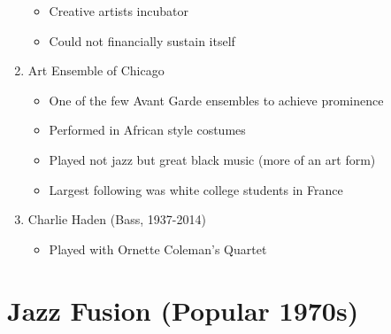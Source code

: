 \documentclass[]{article}
\providecommand{\tightlist}{%
  \setlength{\itemsep}{0pt}\setlength{\parskip}{0pt}}
\begin{document}
\begin{enumerate}
  \begin{itemize}
  \tightlist
  \item
    Creative artists incubator
  \item
    Could not financially sustain itself
  \end{itemize}
\item
  Art Ensemble of Chicago

  \begin{itemize}
  \tightlist
  \item
    One of the few Avant Garde ensembles to achieve prominence
  \item
    Performed in African style costumes
  \item
    Played not jazz but great black music (more of an art form)
  \item
    Largest following was white college students in France
  \end{itemize}
\item
  Charlie Haden (Bass, 1937-2014)

  \begin{itemize}
  \tightlist
  \item
    Played with Ornette Coleman's Quartet
  \end{itemize}
\end{enumerate}

\section{Jazz Fusion (Popular 1970s)}\label{jazz-fusion-popular-1970s}
\end{document}
